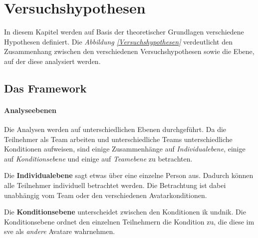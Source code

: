 \documentclass[a4paper,11pt]{article}%
\renewcommand{\\}{\vspace*{0.5\baselineskip} \newline}
\begin{document}


\section{Versuchshypothesen}
In diesem Kapitel werden auf Basis der theoretischer Grundlagen verschiedene Hypothesen definiert.
Die \textit{Abbildung \ref{Versuchshypothesen}} verdeutlicht den Zusammenhang zwischen den verschiedenen Versuchshypothesen sowie die Ebene, auf der diese analysiert werden.
\subsection{Das Framework}

\paragraph{Analyseebenen}
Die Analysen werden auf unterschiedlichen Ebenen durchgeführt.
Da die Teilnehmer als Team arbeiten und unterschiedliche Teams unterschiedliche Konditionen aufweisen, sind einige Zusammenhänge auf \textit{Individualebene}, einige auf \textit{Konditionsebene} und einige auf \textit{Teamebene} zu betrachten.

Die \textbf{Individualebene} sagt etwas über eine einzelne Person aus. Dadurch können alle Teilnehmer individuell betrachtet werden. Die Betrachtung ist dabei unabhängig vom Team oder den verschiedenen Avatarkonditionen. 

Die \textbf{Konditionsebene} unterscheidet zwischen den Konditionen \ac{ik} und\newline \ac{nik}. Die Konditionsebene ordnet den einzelnen Teilnehmern die Kondition zu, die diese im \ac{sve} als \textit{andere} Avatare wahrnehmen. 
\end{document}
